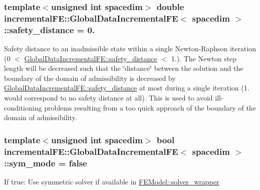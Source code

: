 \subsubsection[{\texorpdfstring{safety\+\_\+distance}{safety_distance}}]{\setlength{\rightskip}{0pt plus 5cm}template$<$unsigned int spacedim$>$ double {\bf incremental\+F\+E\+::\+Global\+Data\+Incremental\+FE}$<$ spacedim $>$\+::safety\+\_\+distance = 0.\hspace{0.3cm}{\ttfamily [private]}}\hypertarget{classincremental_f_e_1_1_global_data_incremental_f_e_a6db92e8e97c6875df1ecf5aa2a3a0345}{}\label{classincremental_f_e_1_1_global_data_incremental_f_e_a6db92e8e97c6875df1ecf5aa2a3a0345}
Safety distance to an inadmissible state within a single Newton-\/\+Raphson iteration (0 $<$ \hyperlink{classincremental_f_e_1_1_global_data_incremental_f_e_a6db92e8e97c6875df1ecf5aa2a3a0345}{Global\+Data\+Incremental\+F\+E\+::safety\+\_\+distance} $<$ 1.). The Newton step length will be decreased such that the \char`\"{}distance\char`\"{} between the solution and the boundary of the domain of admissibility is decreased by \hyperlink{classincremental_f_e_1_1_global_data_incremental_f_e_a6db92e8e97c6875df1ecf5aa2a3a0345}{Global\+Data\+Incremental\+F\+E\+::safety\+\_\+distance} at most during a single iteration (1. would correspond to no safety distance at all). This is used to avoid ill-\/conditioning problems resulting from a too quick approach of the boundary of the domain of admissibility. 
\subsubsection[{\texorpdfstring{sym\+\_\+mode}{sym_mode}}]{\setlength{\rightskip}{0pt plus 5cm}template$<$unsigned int spacedim$>$ bool {\bf incremental\+F\+E\+::\+Global\+Data\+Incremental\+FE}$<$ spacedim $>$\+::sym\+\_\+mode = false\hspace{0.3cm}{\ttfamily [private]}}\hypertarget{classincremental_f_e_1_1_global_data_incremental_f_e_a9986ee5bfccc1b5936c585cf0c5a4474}{}\label{classincremental_f_e_1_1_global_data_incremental_f_e_a9986ee5bfccc1b5936c585cf0c5a4474}
If {\ttfamily true\+:} Use symmetric solver if available in \hyperlink{classincremental_f_e_1_1_f_e_model_a609de66ca9623d737bf3a45a37bb7690}{F\+E\+Model\+::solver\+\_\+wrapper} 
